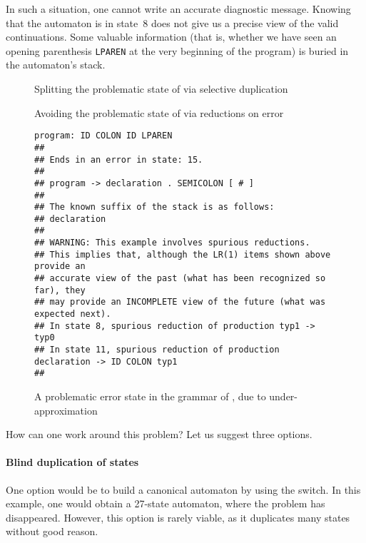 \documentclass[onecolumn,11pt,nocopyrightspace,preprint]{sigplanconf}
\begin{document}
In such a situation, one cannot write an accurate diagnostic message.
Knowing that the automaton is in state~8 does not give us a
precise view of the valid continuations. Some valuable information (that is,
whether we have seen an opening parenthesis \verb+LPAREN+ at the very
beginning of the program) is buried in the automaton's stack.

\begin{figure}

\caption{Splitting the problematic state of  via selective duplication}
\label{fig:declarations:phantom}
\end{figure}

\begin{figure}

\caption{Avoiding the problematic state of  via reductions on error}
\label{fig:declarations:onerrorreduce}
\end{figure}

\begin{figure}
\begin{verbatim}
program: ID COLON ID LPAREN
##
## Ends in an error in state: 15.
##
## program -> declaration . SEMICOLON [ # ]
##
## The known suffix of the stack is as follows:
## declaration
##
## WARNING: This example involves spurious reductions.
## This implies that, although the LR(1) items shown above provide an
## accurate view of the past (what has been recognized so far), they
## may provide an INCOMPLETE view of the future (what was expected next).
## In state 8, spurious reduction of production typ1 -> typ0
## In state 11, spurious reduction of production declaration -> ID COLON typ1
##
\end{verbatim}
\caption{A problematic error state in the grammar of , due to under-approximation}
\label{fig:declarations:under}
\end{figure}

How can one work around this problem? Let us suggest three options.

\paragraph{Blind duplication of states}

One option would be to build a canonical automaton by using the
\ocanonical switch. In this example, one would
obtain a 27-state automaton, where the problem has disappeared. However, this
option is rarely viable, as it duplicates many states without good reason.
\end{document}

